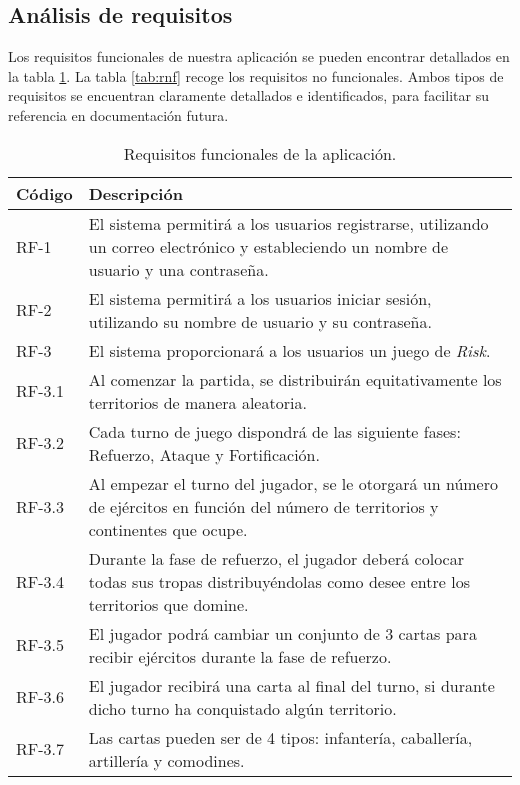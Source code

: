 \documentclass[11pt, a4paper, titlepage]{article}
\begin{document}
\subsection{Análisis de requisitos}
Los requisitos funcionales de nuestra aplicación se pueden encontrar detallados en la tabla \ref{tab:rf}. La tabla \ref{tab:rnf} recoge los requisitos no funcionales. Ambos tipos de requisitos se encuentran claramente detallados e identificados, para facilitar su referencia en documentación futura.
\renewcommand{\arraystretch}{1.3}\\
\begin{longtable}[h!]{| p{} | p{} |}
    \caption{Requisitos funcionales de la aplicación.}
    \label{tab:rf}
    \centering
        \hline
         Código & Descripción  \\
         \hline
         RF-1 & El sistema permitirá a los usuarios registrarse, utilizando un correo electrónico y estableciendo un nombre de usuario y una contraseña.\\
         \hline
         RF-2 & El sistema permitirá a los usuarios iniciar sesión, utilizando su nombre de usuario y su contraseña.\\
         \hline
         RF-3 & El sistema proporcionará a los usuarios un juego de \textit{Risk}.\\
         \hline
         RF-3.1 & Al comenzar la partida, se distribuirán equitativamente los territorios de manera aleatoria.\\
         \hline
         RF-3.2 & Cada turno de juego dispondrá de las siguiente fases: Refuerzo, Ataque y Fortificación. \\
         \hline
         RF-3.3 & Al empezar el turno del jugador, se le otorgará un número de ejércitos en función del número de territorios y continentes que ocupe.\\
         \hline
         RF-3.4 & Durante la fase de refuerzo, el jugador deberá colocar todas sus tropas distribuyéndolas como desee entre los territorios que domine.\\
         \hline
         RF-3.5 & El jugador podrá cambiar un conjunto de 3 cartas para recibir ejércitos durante la fase de refuerzo.\\
         \hline
         RF-3.6 & El jugador recibirá una carta al final del turno, si durante dicho turno ha conquistado algún territorio.\\
         \hline
         RF-3.7 & Las cartas pueden ser de 4 tipos: infantería, caballería, artillería y comodines.

\end{longtable}
\end{document}
